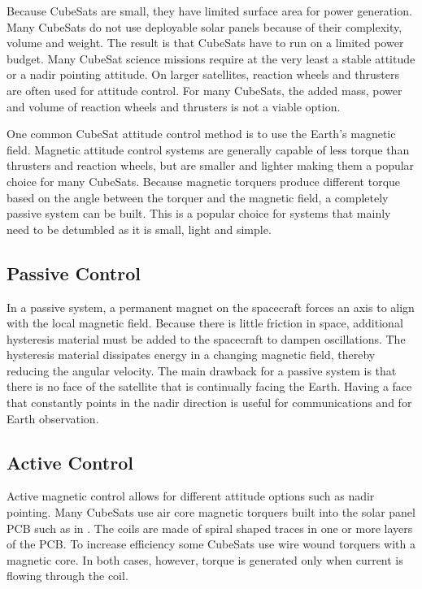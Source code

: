 Because CubeSats are small, they have limited surface area for power generation. Many CubeSats do not use deployable solar panels because of their complexity, volume and weight. The result is that CubeSats have to run on a limited power budget. Many CubeSat science missions require at the very least a stable attitude or a nadir pointing attitude. On larger satellites, reaction wheels and thrusters are often used for attitude control. For many CubeSats, the added mass, power and volume of reaction wheels and thrusters is not a viable option.

One common CubeSat attitude control method is to use the Earth's magnetic field. Magnetic attitude control systems are generally capable of less torque than thrusters and reaction wheels, but are smaller and lighter making them a popular choice for many CubeSats. Because magnetic torquers produce different torque based on the angle between the torquer and the magnetic field, a completely passive system can be built. This is a popular choice for systems that mainly need to be detumbled as it is small, light and simple. 

\subsection{Passive Control}

In a passive system, a permanent magnet on the spacecraft forces an axis to align with the local magnetic field. Because there is little friction in space, additional hysteresis material must be added to the spacecraft to dampen oscillations. The hysteresis material dissipates energy in a changing magnetic field, thereby reducing the angular velocity. The main drawback for a passive system is that there is no face of the satellite that is continually facing the Earth. Having a face that constantly points in the nadir direction is useful for communications and for Earth observation.

\subsection{Active Control}

Active magnetic control allows for different attitude options such as nadir pointing. Many CubeSats use air core magnetic torquers built into the solar panel \ac{PCB} such as in \cite{6511478,ClydePannel}. The coils are made of spiral shaped traces in one or more layers of the \ac{PCB}. To increase efficiency some CubeSats use wire wound torquers with a magnetic core. In both cases, however, torque is generated only when current is flowing through the coil. 

